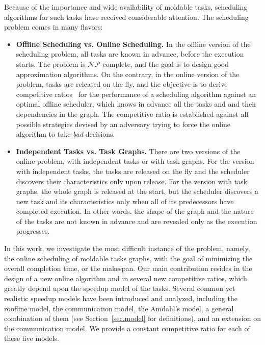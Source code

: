 \documentclass{article}
\begin{document}
Because of the importance and wide availability of moldable tasks,
scheduling algorithms for such tasks have received considerable attention. The scheduling problem comes in many flavors:

\begin{itemize}[leftmargin=*]
\item \textbf{Offline Scheduling vs. Online Scheduling.} In the offline version of the scheduling problem, all tasks are known in advance, before the execution starts. The problem is $\mathcal{NP}$-complete, and the goal is to design good approximation algorithms. On the contrary, in the online version of the problem,
tasks are released on the fly, and the objective is to derive competitive ratios~\cite{Sleator1985} for the performance of a scheduling algorithm
against an optimal offline scheduler, which knows in advance all the tasks and and their dependencies in the graph. The competitive ratio is established against all possible strategies devised by an adversary trying to force the online algorithm to take \emph{bad} decisions.
\item \textbf{Independent Tasks vs. Task Graphs.} There are two versions of the online problem, with independent tasks
or with task graphs.
For the version with independent tasks, the tasks are released on the fly and the scheduler discovers their characteristics only upon release. For the version with task graphs, the whole graph is released at the start, but the scheduler discovers a new task and its characteristics only when all of its predecessors have completed execution. In other words, the shape of the graph and the nature of the tasks are not known in advance and are revealed only as the execution progresses.
\end{itemize}

In this work, we investigate the most difficult instance of the problem, namely, the online scheduling of moldable tasks graphs, with the goal of minimizing the overall completion time, or the makespan.
Our main contribution resides in the design of a new online algorithm and in several new competitive ratios,
which greatly depend upon the speedup model of the tasks. Several common yet realistic speedup models have been introduced
and analyzed, including the roofline model, the communication model, the Amdahl's model, a general combination of them (see Section~\ref{sec.model} for definitions), and an extension on the communication model.
We provide a constant competitive ratio for each of these five models. 
\end{document}
